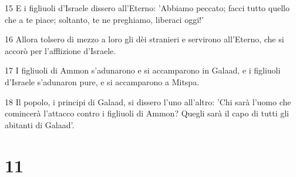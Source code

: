 \par 15 E i figliuoli d'Israele dissero all'Eterno: 'Abbiamo peccato; facci tutto quello che a te piace; soltanto, te ne preghiamo, liberaci oggi!'
\par 16 Allora tolsero di mezzo a loro gli dèi stranieri e servirono all'Eterno, che si accorò per l'afflizione d'Israele.
\par 17 I figliuoli di Ammon s'adunarono e si accamparono in Galaad, e i figliuoli d'Israele s'adunaron pure, e si accamparono a Mitspa.
\par 18 Il popolo, i principi di Galaad, si dissero l'uno all'altro: 'Chi sarà l'uomo che comincerà l'attacco contro i figliuoli di Ammon? Quegli sarà il capo di tutti gli abitanti di Galaad'.

\chapter{11}

